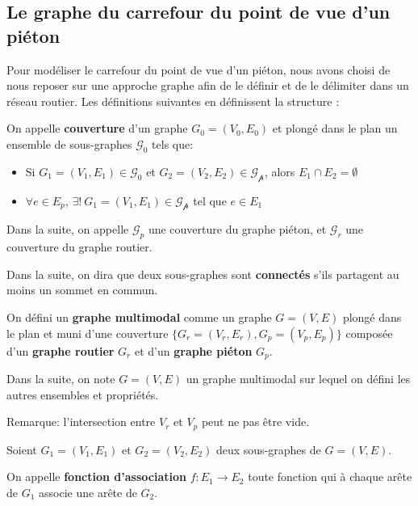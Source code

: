 \subsection{Le graphe du carrefour du point de vue d'un piéton}

\label{sec:modelisation_definitions}

Pour modéliser le carrefour du point de vue d'un piéton, nous avons choisi de nous reposer sur une approche graphe afin de le définir et de le délimiter dans un réseau routier. Les définitions suivantes en définissent la structure :

\begin{definition}
    On appelle \textbf{couverture} d'un graphe $G_0 = (V_0,E_0)$ et plongé dans le plan un ensemble de sous-graphes $\mathcal{G_0}$ tels que:
    \begin{itemize}
        \item Si $G_1=(V_1, E_1) \in \mathcal{G_0}$ et $G_2=(V_2, E_2) \in \mathcal{G_p}$, alors $E_1 \cap E_2 = \emptyset$
        \item $\forall e \in E_p$, $\exists!~G_1=(V_1, E_1) \in \mathcal{G_p}$ tel que $e \in E_1$
    \end{itemize}
    
    Dans la suite, on appelle $\mathcal{G}_p$ une couverture du graphe piéton, et $\mathcal{G}_r$ une couverture du graphe routier.
    
    Dans la suite, on dira que deux sous-graphes sont \textbf{connectés} s'ils partagent au moins un sommet en commun.
\end{definition}

\begin{definition}
    On défini un \textbf{graphe multimodal} comme un graphe $G = (V,E)$ plongé dans le plan et muni d'une couverture $\{G_r=(V_r, E_r), G_p = (V_p, E_p)\}$ composée d'un \textbf{graphe routier} $G_r$ et d'un \textbf{graphe piéton} $G_p$.

    Dans la suite, on note $G = (V,E)$ un graphe multimodal sur lequel on défini les autres ensembles et propriétés.
\end{definition}

\noindent
Remarque: l'intersection entre $V_r$ et $V_p$ peut ne pas être vide.

\begin{definition}
    Soient $G_1=(V_1, E_1)$ et $G_2=(V_2, E_2)$ deux sous-graphes de $G=(V, E)$.
    
    On appelle \textbf{fonction d'association} $f: E_1 \rightarrow E_2$ toute fonction qui à chaque arête de $G_1$ associe une arête de $G_2$.
\end{definition}

